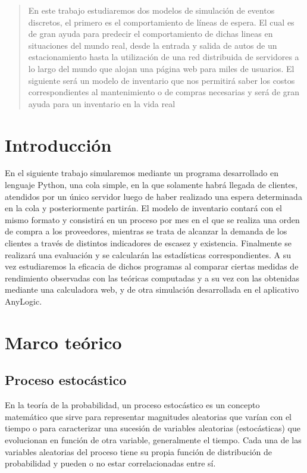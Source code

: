\nocite{*} %
\begin{abstract}
  En este trabajo estudiaremos dos modelos de simulación de eventos discretos, el primero es el comportamiento
  de líneas de espera. El cual es de gran ayuda para predecir el comportamiento de dichas lineas en
  situaciones del mundo real, desde la entrada y salida de autos de un estacionamiento hasta la utilización
  de una red distribuida de servidores a lo largo del mundo que alojan una página web para miles de usuarios.
  El siguiente será un modelo de inventario que nos permitirá saber los costos correspondientes al mantenimiento
  o de compras necesarias y será de gran ayuda para un inventario en la vida real
\end{abstract}


\section{Introducción}\label{sec:introduccion}
En el siguiente trabajo simularemos mediante un programa desarrollado en lenguaje Python, una cola simple, en la que
solamente habrá llegada de clientes, atendidos por un único servidor luego de haber realizado una espera
determinada en la cola y posteriormente partirán.
El modelo de inventario contará con el mismo formato y consistirá en un proceso por mes en el que se realiza una orden de compra
a los proveedores, mientras se trata de alcanzar la demanda de los clientes a través de distintos indicadores de escasez y
existencia.
Finalmente se realizará una evaluación y se calcularán las estadísticas correspondientes.
A su vez estudiaremos la eficacia de dichos programas al comparar ciertas medidas de rendimiento observadas con las
teóricas computadas y a su vez con las obtenidas mediante una calculadora web, y de otra simulación desarrollada
en el aplicativo AnyLogic.


\section{Marco teórico}\label{sec:marco-teórico}

\subsection{Proceso estocástico}\label{subsec:proceso-estocástico}
En la teoría de la probabilidad, un proceso estocástico es un concepto matemático que sirve para representar
magnitudes aleatorias que varían con el tiempo o para caracterizar una sucesión de variables aleatorias (estocásticas)
que evolucionan en función de otra variable, generalmente el tiempo.
Cada una de las variables aleatorias del proceso tiene su propia función de distribución de probabilidad y pueden o no
estar correlacionadas entre sí.

